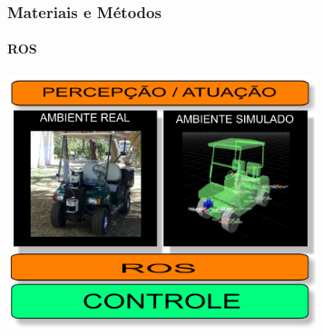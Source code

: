 \documentclass[brazil]{beamer}
\begin{document}
\begin{frame}
\frametitle{Materiais e Métodos}
\framesubtitle{ROS}
\includegraphics[width=9cm,keepaspectratio]{../img/ros-slide.png}
\end{frame}



\end{document}
